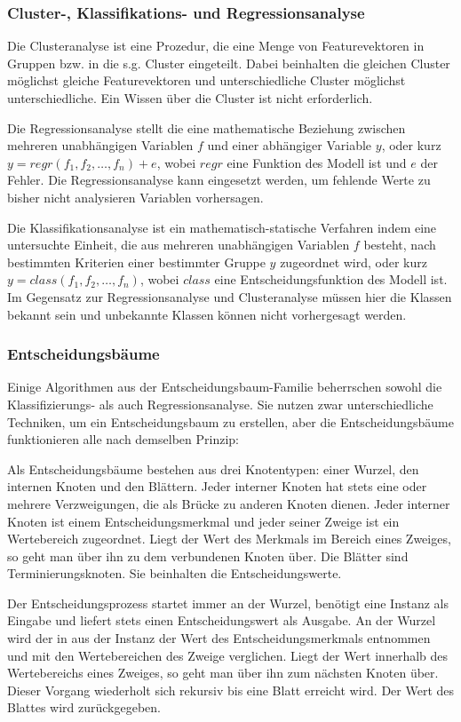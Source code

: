 \subsubsection{Cluster-, Klassifikations- und Regressionsanalyse}
Die Clusteranalyse ist eine Prozedur, die eine Menge von Featurevektoren in Gruppen bzw. in die s.g. Cluster eingeteilt. Dabei beinhalten die gleichen Cluster möglichst gleiche Featurevektoren und unterschiedliche Cluster möglichst unterschiedliche. Ein Wissen über die Cluster ist nicht erforderlich.

Die Regressionsanalyse stellt die eine mathematische Beziehung zwischen mehreren unabhängigen Variablen $f$ und einer abhängiger Variable $y$, oder kurz $y = regr(f_1, f_2, \dots, f_n) + e$, wobei $regr$ eine Funktion des Modell ist und $e$ der Fehler.
Die Regressionsanalyse kann eingesetzt werden, um fehlende Werte zu bisher nicht analysieren Variablen vorhersagen.

Die Klassifikationsanalyse ist ein mathematisch-statische Verfahren indem eine untersuchte Einheit, die aus mehreren unabhängigen Variablen $f$ besteht, nach bestimmten Kriterien einer bestimmter Gruppe $y$ zugeordnet wird, oder kurz $y = class(f_1, f_2, \dots, f_n)$, wobei $class$ eine Entscheidungsfunktion des Modell ist. Im Gegensatz zur Regressionsanalyse und Clusteranalyse müssen hier die Klassen bekannt sein und unbekannte Klassen können nicht vorhergesagt werden.


\subsubsection{Entscheidungsbäume}
Einige Algorithmen aus der Entscheidungsbaum-Familie beherrschen sowohl die Klassifizierungs- als auch Regressionsanalyse. 
Sie nutzen zwar unterschiedliche Techniken, um ein Entscheidungsbaum zu erstellen, aber die Entscheidungsbäume funktionieren alle nach demselben Prinzip: 

Als Entscheidungsbäume bestehen aus drei Knotentypen: einer Wurzel, den internen Knoten und den Blättern. 
Jeder interner Knoten hat stets eine oder mehrere Verzweigungen, die als Brücke zu anderen Knoten dienen. 
Jeder interner Knoten ist einem Entscheidungsmerkmal und jeder seiner Zweige ist ein Wertebereich zugeordnet. 
Liegt der Wert des Merkmals im Bereich eines Zweiges, so geht man über ihn zu dem verbundenen Knoten über. 
Die Blätter sind Terminierungsknoten. 
Sie beinhalten die Entscheidungswerte. 

Der Entscheidungsprozess startet immer an der Wurzel, benötigt eine Instanz als Eingabe und liefert stets einen Entscheidungswert als Ausgabe. 
An der Wurzel wird der in aus der Instanz der Wert des Entscheidungsmerkmals entnommen und mit den Wertebereichen des Zweige verglichen. 
Liegt der Wert innerhalb des Wertebereichs eines Zweiges, so geht man über ihn zum nächsten Knoten über. 
Dieser Vorgang wiederholt sich rekursiv bis eine Blatt erreicht wird. Der Wert des Blattes wird zurückgegeben. 

